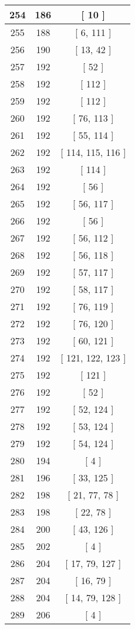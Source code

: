 \begin{center}
\begin{longtable}[H]{|| c c c ||}
\hline
254 & 186 & [ 10 ] \\ 
\hline
255 & 188 & [ 6, 111 ] \\ 
\hline
256 & 190 & [ 13, 42 ] \\ 
\hline
257 & 192 & [ 52 ] \\ 
\hline
258 & 192 & [ 112 ] \\ 
\hline
259 & 192 & [ 112 ] \\ 
\hline
260 & 192 & [ 76, 113 ] \\ 
\hline
261 & 192 & [ 55, 114 ] \\ 
\hline
262 & 192 & [ 114, 115, 116 ] \\ 
\hline
263 & 192 & [ 114 ] \\ 
\hline
264 & 192 & [ 56 ] \\ 
\hline
265 & 192 & [ 56, 117 ] \\ 
\hline
266 & 192 & [ 56 ] \\ 
\hline
267 & 192 & [ 56, 112 ] \\ 
\hline
268 & 192 & [ 56, 118 ] \\ 
\hline
269 & 192 & [ 57, 117 ] \\ 
\hline
270 & 192 & [ 58, 117 ] \\ 
\hline
271 & 192 & [ 76, 119 ] \\ 
\hline
272 & 192 & [ 76, 120 ] \\ 
\hline
273 & 192 & [ 60, 121 ] \\ 
\hline
274 & 192 & [ 121, 122, 123 ] \\ 
\hline
275 & 192 & [ 121 ] \\ 
\hline
276 & 192 & [ 52 ] \\ 
\hline
277 & 192 & [ 52, 124 ] \\ 
\hline
278 & 192 & [ 53, 124 ] \\ 
\hline
279 & 192 & [ 54, 124 ] \\ 
\hline
280 & 194 & [ 4 ] \\ 
\hline
281 & 196 & [ 33, 125 ] \\ 
\hline
282 & 198 & [ 21, 77, 78 ] \\ 
\hline
283 & 198 & [ 22, 78 ] \\ 
\hline
284 & 200 & [ 43, 126 ] \\ 
\hline
285 & 202 & [ 4 ] \\ 
\hline
286 & 204 & [ 17, 79, 127 ] \\ 
\hline
287 & 204 & [ 16, 79 ] \\ 
\hline
288 & 204 & [ 14, 79, 128 ] \\ 
\hline
289 & 206 & [ 4 ] \\ 

\end{longtable}
\end{center}
